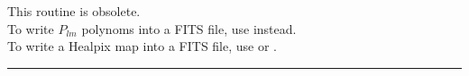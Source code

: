 
\sloppy


 \section[write\_dbintab]{ }
\label{sub:write_dbintab}
\author{Frode K.~Hansen}

\begin{facility}
{This routine is obsolete. \\
To write $P_{lm}$ polynoms into a FITS file,
use 
instead. \\
To write a Healpix map into a FITS file,
use 
or 
.}
{\modFitstools}
\end{facility}


\rule{\hsize}{2mm}

\newpage
